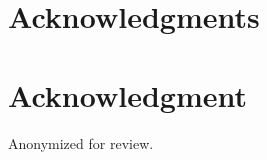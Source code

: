 \documentclass[conference,compsoc]{IEEEtran}
\begin{document}







\ifCLASSOPTIONcompsoc
  \section*{Acknowledgments}
\else
  \section*{Acknowledgment}
\fi
\ifanonymous
Anonymized for review.
\else



\fi



\newpage



\appendix

\end{document}
